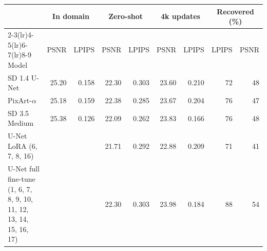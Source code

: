 \begin{tabular}{lrrrrrrrr}
\toprule
& \multicolumn{2}{c}{In domain} & \multicolumn{2}{c}{Zero-shot} & \multicolumn{2}{c}{4k updates} & \multicolumn{2}{c}{Recovered (\%)} \\
\cmidrule(lr){2-3}\cmidrule(lr){4-5}\cmidrule(lr){6-7}\cmidrule(lr){8-9}
Model & PSNR & LPIPS & PSNR & LPIPS & PSNR & LPIPS & LPIPS & PSNR \\
\midrule
SD 1.4 U-Net & 25.20 & 0.158 & 22.30 & 0.303 & 23.60 & 0.210 & 72 & 48 \\
PixArt-$\alpha$ & 25.18 & 0.159 & 22.38 & 0.285 & 23.67 & 0.204 & 76 & 47 \\
SD 3.5 Medium & 25.38 & 0.126 & 22.09 & 0.262 & 23.83 & 0.166 & 76 & 48 \\
\midrule
U-Net LoRA (6, 7, 8, 16) &  &  & 21.71 & 0.292 & 22.88 & 0.209 & 71 & 41 \\
U-Net full fine-tune (1, 6, 7, 8, 9, 10, 11, 12, 13, 14, 15, 16, 17) &  &  & 22.30 & 0.303 & 23.98 & 0.184 & 88 & 54 \\
\bottomrule
\end{tabular}
